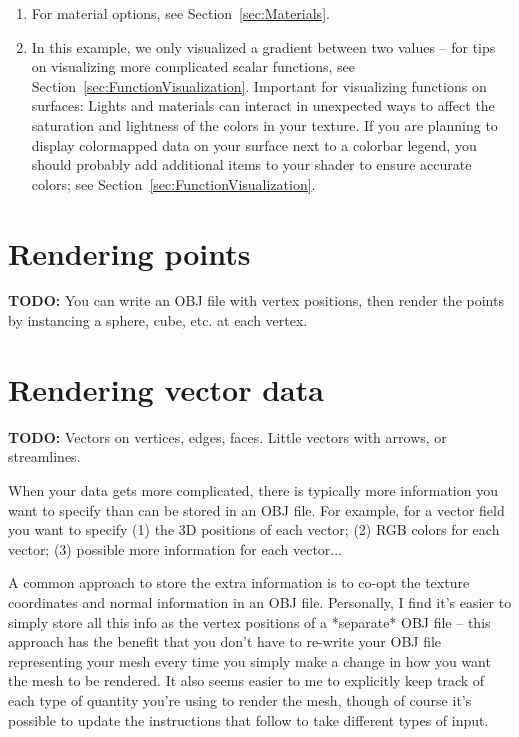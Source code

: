 \documentclass[10pt]{article}
\begin{document}
\begin{enumerate}
\begin{figure}[H]
        \label{fig:scalar-data-final}
    \end{figure}
    \item For material options, see Section~\ref{sec:Materials}.
    \item In this example, we only visualized a gradient between two values -- for tips on visualizing more complicated scalar functions, see Section~\ref{sec:FunctionVisualization}. Important for visualizing functions on surfaces: Lights and materials can interact in unexpected ways to affect the saturation and lightness of the colors in your texture. If you are planning to display colormapped data on your surface next to a colorbar legend, you should probably add additional items to your shader to ensure accurate colors; see Section~\ref{sec:FunctionVisualization}. 
\end{enumerate}

\section{Rendering points}
\textbf{TODO:} You can write an OBJ file with vertex positions, then render the points by instancing a sphere, cube, etc. at each vertex.

\section{Rendering vector data}
\textbf{TODO:} Vectors on vertices, edges, faces. Little vectors with arrows, or streamlines.

When your data gets more complicated, there is typically more information you want to specify than can be stored in an OBJ file. For example, for a vector field you want to specify (1) the 3D positions of each vector; (2) RGB colors for each vector; (3) possible more information for each vector...

A common approach to store the extra information is to co-opt the texture coordinates and normal information in an OBJ file. Personally, I find it's easier to simply store all this info as the vertex positions of a *separate* OBJ file -- this approach has the benefit that you don't have to re-write your OBJ file representing your mesh every time you simply make a change in how you want the mesh to be rendered. It also seems easier to me to explicitly keep track of each type of quantity you're using to render the mesh, though of course it's possible to update the instructions that follow to take different types of input.
\end{document}
